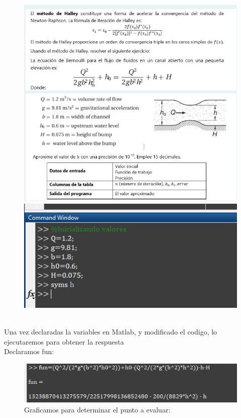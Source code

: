 \documentclass{article}
\theoremstyle{mytheoremstyle}
\theoremstyle{mytheoremstyle}
\theoremstyle{myproblemstyle}
\begin{document}
\pagebreak
\begin{figure}[ht]
    \includegraphics[scale=0.8]{img/eje3_1.png} \\
    \includegraphics[scale=0.7]{img/eje3_2.png}
\end{figure}
\noindent \\ Una vez declaradas la variables en Matlab, y modificado el codigo, lo ejecutaremos para obtener la respuesta
\\Declaramos fun:
\begin{figure}[ht]
    \includegraphics[scale=0.7]{img/eje3_3.png}{\\Graficamos para determinar el punto a evaluar:}
\end{figure}
\end{document}
